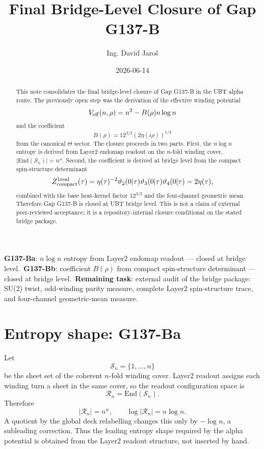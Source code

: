 \documentclass[12pt,a4paper]{article}
\title{Final Bridge-Level Closure of Gap G137-B}
\author{Ing. David Jaroš}
\date{2026-06-14}
\begin{document}
\maketitle

\begin{abstract}
This note consolidates the final bridge-level closure of Gap G137-B in the UBT
alpha route.  The previously open step was the derivation of the effective
winding potential
\[
  V_{\rm eff}(n,\rho)=n^2-B(\rho)n\log n
\]
and the coefficient
\[
  B(\rho)=12^{3/2}(2\eta(i\rho))^{1/4}
\]
from the canonical $\Theta$ sector.  The closure proceeds in two parts.  First,
the $n\log n$ entropy is derived from Layer2 endomap readout on the $n$-fold
winding cover, $|\mathrm{End}(\mathcal S_n)|=n^n$.  Second, the coefficient is
derived at bridge level from the compact spin-structure determinant
\[
  Z_{\rm compact}^{1\rm real}(\tau)
  =\eta(\tau)^{-2}\vartheta_2(0|\tau)\vartheta_3(0|\tau)\vartheta_4(0|\tau)
  =2\eta(\tau),
\]
combined with the base heat-kernel factor $12^{3/2}$ and the four-channel
geometric mean.  Therefore Gap G137-B is closed at UBT bridge level.  This is
not a claim of external peer-reviewed acceptance; it is a repository-internal
closure conditional on the stated bridge package.
\end{abstract}

\begin{statusbox}
\textbf{G137-Ba}: $n\log n$ entropy from Layer2 endomap readout — closed at
bridge level.\
\textbf{G137-Bb}: coefficient $B(\rho)$ from compact spin-structure determinant
— closed at bridge level.\
\textbf{Remaining task}: external audit of the bridge package: SU(2) twist,
odd-winding parity measure, complete Layer2 spin-structure trace, and
four-channel geometric-mean measure.
\end{statusbox}

\section{Entropy shape: G137-Ba}

Let
\[
  \mathcal S_n=\{1,\ldots,n\}
\]
be the sheet set of the coherent $n$-fold winding cover.  Layer2 readout assigns
each winding turn a sheet in the same cover, so the readout configuration space
is
\[
  \mathcal R_n=\mathrm{End}(\mathcal S_n).
\]
Therefore
\[
  |\mathcal R_n|=n^n,
  \qquad
  \log|\mathcal R_n|=n\log n.
\]
A quotient by the global deck relabelling changes this only by $-\log n$, a
subleading correction.  Thus the leading entropy shape required by the alpha
potential is obtained from the Layer2 readout structure, not inserted by hand.
\end{document}
